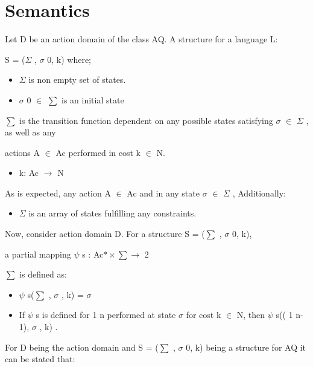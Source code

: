 \documentclass[11pt]{article}
\begin{document}
\section{Semantics}
Let D be an action domain of the class AQ. A structure for a language L:\par
S = ($  \Sigma  $ , $ \sigma $ 0, k) where;\par
\begin{itemize}
	\item $  \Sigma  $  is non empty set of states.\par

	\item $ \sigma $ 0 $ \in $  $ \sum $ is an initial state
\end{itemize}\par
$ \sum $  is the transition function dependent on any possible states satisfying $ \sigma $  $ \in $  $  \Sigma  $ , as well as any\par
actions A $ \in $  Ac performed in cost k $ \in $  N.\par
\begin{itemize}
	\item k: Ac $ \rightarrow $  N
\end{itemize}\par
As is expected, any action A $ \in $  Ac and in any state $ \sigma $  $ \in $  $  \Sigma  $ , Additionally:\par
\begin{itemize}
	\item $  \Sigma  $  is an array of states fulfilling any constraints.
\end{itemize}\par
Now, consider action domain D. For a structure S = ($ \sum $ , $ \sigma $ 0, k),\par
a partial mapping $ \psi $ s : Ac$\ast \times \sum \rightarrow $  2\par
$ \sum $  is defined as:\par
\begin{itemize}
	\item $ \psi $ s($ \sum $ , $ \sigma $ , k) = $ \sigma $ \par

	\item If $ \psi $ s is defined for 1 n performed at state $ \sigma $  for cost k $ \in $  N, then $ \psi $ s(( 1 n-1), $ \sigma $ , k) .
\end{itemize}\par
For D being the action domain and S = ($ \sum $ , $ \sigma $ 0, k) being a structure for AQ it can be stated that:\par
\end{document}
